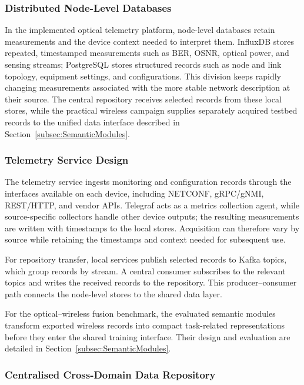 \documentclass[9pt,twocolumn,twoside]{osajnl}
\begin{document}
\subsubsection{Distributed Node-Level Databases}
In the implemented optical telemetry platform, node-level databases retain measurements and the device context needed to interpret them. InfluxDB stores repeated, timestamped measurements such as BER, OSNR, optical power, and sensing streams; PostgreSQL stores structured records such as node and link topology, equipment settings, and configurations. This division keeps rapidly changing measurements associated with the more stable network description at their source. The central repository receives selected records from these local stores, while the practical wireless campaign supplies separately acquired testbed records to the unified data interface described in Section~\ref{subsec:SemanticModules}.

\subsubsection{Telemetry Service Design}

The telemetry service ingests monitoring and configuration records through the interfaces available on each device, including NETCONF, gRPC/gNMI, REST/HTTP, and vendor APIs. Telegraf acts as a metrics collection agent, while source-specific collectors handle other device outputs; the resulting measurements are written with timestamps to the local stores. Acquisition can therefore vary by source while retaining the timestamps and context needed for subsequent use.


For repository transfer, local services publish selected records to Kafka topics, which group records by stream. A central consumer subscribes to the relevant topics and writes the received records to the repository. This producer--consumer path connects the node-level stores to the shared data layer.

For the optical--wireless fusion benchmark, the evaluated semantic modules transform exported wireless records into compact task-related representations before they enter the shared training interface. Their design and evaluation are detailed in Section~\ref{subsec:SemanticModules}.

\subsubsection{Centralised Cross-Domain Data Repository}
\end{document}
